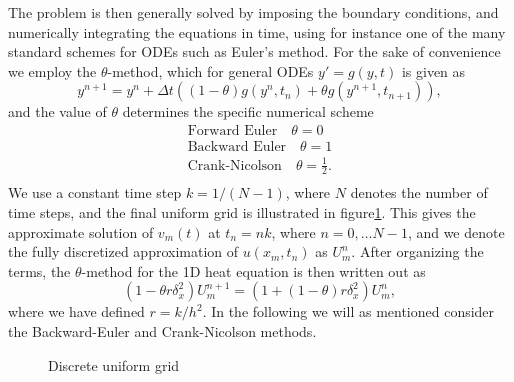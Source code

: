 The problem is then generally solved by imposing the boundary conditions, 
and numerically integrating the equations in time, 
using for instance one of the many standard schemes for ODEs such as Euler's method. 
For the sake of convenience we employ the $\theta$-method, 
which for general ODEs $y' = g(y, t)$ is given as
\begin{equation*}
    y^{n+1} = y^n + \Delta t \left((1-\theta)g(y^n, t_n)+\theta g(y^{n+1}, t_{n+1})\right), 
\end{equation*}
and the value of $\theta$ determines the specific numerical scheme 
\begin{equation*}
\begin{split}
    \text{Forward Euler} \quad \theta = 0 \\
    \text{Backward Euler} \quad \theta = 1 \\
    \text{Crank-Nicolson} \quad \theta = \frac{1}{2}. \\
\end{split}
\end{equation*}
We use a constant time step $k = 1/(N-1)$, 
where $N$ denotes the number of time steps, 
and the final uniform grid is illustrated in figure\ref{fig:2-uniform-grid}. 
This gives the approximate solution of $v_m(t)$ at $t_n = nk$, 
where $n = 0, \ldots N-1$, 
and we denote the fully discretized approximation of $u(x_m, t_n)$ as $U_{m}^{n}$. 
After organizing the terms, 
the $\theta$-method for the 1D heat equation is then written out as
\begin{equation}
    (1 - \theta r \delta_x^2)U_m^{n+1} = \left(1 + (1-\theta)r\delta_x^2\right)U_m^n, 
    \label{eq:theta-heat}
\end{equation}
where we have defined $r=k/h^2$. 
In the following we will as mentioned consider the Backward-Euler and Crank-Nicolson methods. 
\begin{figure}[ht!]
    \centering
    
    \caption{Discrete uniform grid}
    \label{fig:2-uniform-grid}
\end{figure}

